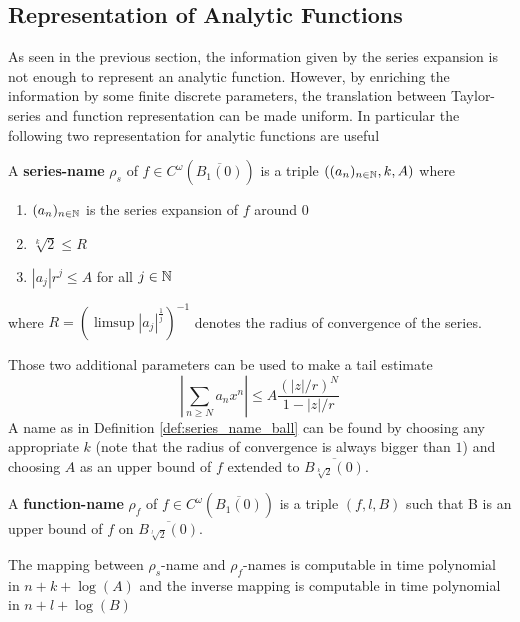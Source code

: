 	\subsection{Representation of Analytic Functions}
	 As seen in the previous section, the information given by the series expansion is not enough to represent an analytic function.
	 However, by enriching the information by some finite discrete parameters, the translation between Taylor-series and function representation can be made uniform.
	 In particular the following two representation for analytic functions are useful
	 \begin{definition}\label{def:series_name_ball}
	 	A \textbf{series-name} $\rho_s$ of $f \in C^\omega(\overline{B_1(0)})$ is a triple $((a_n)_{n \in \mathbb N}, k, A)$ where 
	 	\begin{enumerate}
	 		\item $(a_n)_{n \in \mathbb N}$ is the series expansion of $f$ around $0$
	 		\item $\sqrt[k]{2} \leq R$ 
	 		\item $|a_j|r^j \leq A$ for all $j \in \mathbb N$
	 	\end{enumerate}
	 	where $R = (\limsup |a_j|^{\frac{1}{j}})^{-1}$ denotes the radius of convergence of the series.
	 \end{definition}
	 Those two additional parameters can be used to make a tail estimate 
	 \begin{equation}\label{eqn:tail_estimate}
	  \left | \sum_{n \geq N} a_nx^n \right | \leq A \frac{(|z|/r)^N}{1-|z|/r}
	 \end{equation}
	 A name as in Definition \ref{def:series_name_ball} can be found by choosing any appropriate $k$ (note that the radius of convergence is always bigger than $1$) and choosing $A$ as an upper bound of $f$ extended to $\overline{B_{\sqrt[k]{2}}(0)}$. 
	 \begin{definition}
	 	A \textbf{function-name} $\rho_f$ of $f \in C^\omega(\overline{B_1(0)})$ is a triple $(f, l, B)$ such that
		B is an upper bound of $f$ on $\overline{B_{\sqrt[l]{2}}(0)}$.
	 \end{definition}
	 \begin{theorem}\cite{Kaw}\label{thm:representation_conversion}
	 	The mapping between $\rho_s$-name and $\rho_f$-names is computable in time polynomial in 
	 	$n+k+\log(A)$ and the inverse mapping is computable in time polynomial in $n+l+\log(B)$ 
	 \end{theorem}

